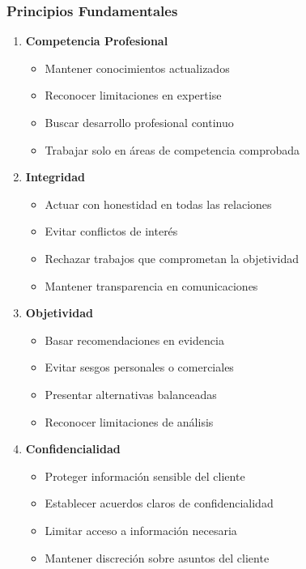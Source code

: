 \documentclass[12pt,letterpaper,oneside]{book}
\begin{document}
\subsubsection{Principios Fundamentales}

\begin{enumerate}
\item \textbf{Competencia Profesional}
   \begin{itemize}
   \item Mantener conocimientos actualizados
   \item Reconocer limitaciones en expertise
   \item Buscar desarrollo profesional continuo
   \item Trabajar solo en áreas de competencia comprobada
   \end{itemize}

\item \textbf{Integridad}
   \begin{itemize}
   \item Actuar con honestidad en todas las relaciones
   \item Evitar conflictos de interés
   \item Rechazar trabajos que comprometan la objetividad
   \item Mantener transparencia en comunicaciones
   \end{itemize}

\item \textbf{Objetividad}
   \begin{itemize}
   \item Basar recomendaciones en evidencia
   \item Evitar sesgos personales o comerciales
   \item Presentar alternativas balanceadas
   \item Reconocer limitaciones de análisis
   \end{itemize}

\item \textbf{Confidencialidad}
   \begin{itemize}
   \item Proteger información sensible del cliente
   \item Establecer acuerdos claros de confidencialidad
   \item Limitar acceso a información necesaria
   \item Mantener discreción sobre asuntos del cliente
   \end{itemize}
\end{enumerate}
\end{document}
